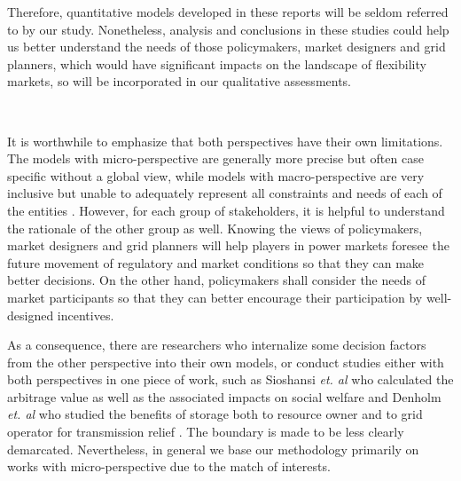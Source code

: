 Therefore, quantitative models developed in these reports will be seldom referred to by our study. Nonetheless, analysis and conclusions in these studies could help us better understand the needs of those policymakers, market designers and grid planners, which would have significant impacts on the landscape of flexibility markets, so will be incorporated in our qualitative assessments. 

~\newline

It is worthwhile to emphasize that both perspectives have their own limitations. The models with micro-perspective are generally more precise but often case specific without a global view, while models with macro-perspective are very inclusive but unable to adequately represent all constraints and needs of each of the entities \cite{Zucker2013}. However, for each group of stakeholders, it is helpful to understand the rationale of the other group as well. Knowing the views of policymakers, market designers and grid planners will help players in power markets foresee the future movement of regulatory and market conditions so that they can make better decisions. On the other hand, policymakers shall consider the needs of market participants so that they can better encourage their participation by well-designed incentives.

As a consequence, there are researchers who internalize some decision factors from the other perspective into their own models, or conduct studies either with both perspectives in one piece of work, such as Sioshansi \textit{et. al} who calculated the arbitrage value as well as the associated impacts on social welfare \cite{Sioshansi2009} and Denholm \textit{et. al} who studied the benefits of storage both to resource owner and to grid operator for transmission relief \cite{Denholm2009}. The boundary is made to be less clearly demarcated. Nevertheless, in general we base our methodology primarily on works with micro-perspective due to the match of interests.





